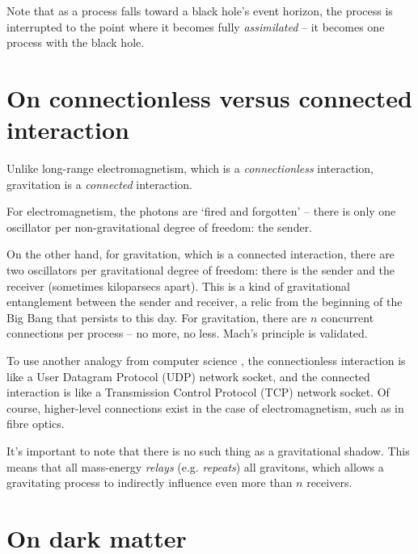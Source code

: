 \documentclass[12pt]{article}
\begin{document}
{Note that as a process falls toward a black hole's event horizon, the process is interrupted to the point where it becomes fully {\textit{assimilated}} -- it becomes one process with the black hole.








\section{On connectionless versus connected interaction}

Unlike long-range electromagnetism, which is a {\textit{connectionless}} interaction, gravitation is a {\textit{connected}} interaction.

For electromagnetism, the photons are `fired and forgotten' -- there is only one oscillator per non-gravitational degree of freedom: the sender.

On the other hand, for gravitation, which is a connected interaction, there are two oscillators per gravitational degree of freedom: there is the sender and the receiver (sometimes kiloparsecs apart).
This is a kind of gravitational entanglement between the sender and receiver, a relic from the beginning of the Big Bang that persists to this day.
For gravitation, there are $n$ concurrent connections per process -- no more, no less.
Mach's principle \cite{misner} is validated.

To use another analogy from computer science \cite{stevens}, the connectionless interaction is like a User Datagram Protocol (UDP) network socket, and the connected interaction is like a Transmission Control Protocol (TCP) network socket.
Of course, higher-level connections exist in the case of electromagnetism, such as in fibre optics.

It's important to note that there is no such thing as a gravitational shadow.
This means that all mass-energy {\textit{relays}} (e.g. {\textit{repeats}}) all gravitons, which allows a gravitating process to indirectly influence even more than $n$ receivers.





\section{On dark matter}

}
\end{document}
